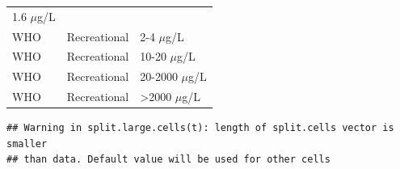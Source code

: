 \documentclass[11pt,]{article}
\begin{document}
\begin{longtable}[c]{@{}lll@{}}
\begin{minipage}[t]{0.20\columnwidth}\raggedright\strut
1.6 \(\mu\)g/L
\strut\end{minipage}\tabularnewline
\begin{minipage}[t]{0.11\columnwidth}\raggedright\strut
WHO
\strut\end{minipage} &
\begin{minipage}[t]{0.16\columnwidth}\raggedright\strut
Recreational
\strut\end{minipage} &
\begin{minipage}[t]{0.20\columnwidth}\raggedright\strut
2-4 \(\mu\)g/L
\strut\end{minipage}\tabularnewline
\begin{minipage}[t]{0.11\columnwidth}\raggedright\strut
WHO
\strut\end{minipage} &
\begin{minipage}[t]{0.16\columnwidth}\raggedright\strut
Recreational
\strut\end{minipage} &
\begin{minipage}[t]{0.20\columnwidth}\raggedright\strut
10-20 \(\mu\)g/L
\strut\end{minipage}\tabularnewline
\begin{minipage}[t]{0.11\columnwidth}\raggedright\strut
WHO
\strut\end{minipage} &
\begin{minipage}[t]{0.16\columnwidth}\raggedright\strut
Recreational
\strut\end{minipage} &
\begin{minipage}[t]{0.20\columnwidth}\raggedright\strut
20-2000 \(\mu\)g/L
\strut\end{minipage}\tabularnewline
\begin{minipage}[t]{0.11\columnwidth}\raggedright\strut
WHO
\strut\end{minipage} &
\begin{minipage}[t]{0.16\columnwidth}\raggedright\strut
Recreational
\strut\end{minipage} &
\begin{minipage}[t]{0.20\columnwidth}\raggedright\strut
\textgreater{}2000 \(\mu\)g/L
\strut\end{minipage}\tabularnewline
\bottomrule
\end{longtable}

\newpage

\begin{verbatim}
## Warning in split.large.cells(t): length of split.cells vector is smaller
## than data. Default value will be used for other cells
\end{verbatim}
\end{document}
